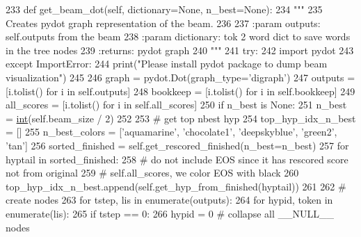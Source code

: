 \begin{DoxyCode}
233     \textcolor{keyword}{def }get\_beam\_dot(self, dictionary=None, n\_best=None):
234         \textcolor{stringliteral}{"""}
235 \textcolor{stringliteral}{        Creates pydot graph representation of the beam.}
236 \textcolor{stringliteral}{}
237 \textcolor{stringliteral}{        :param outputs: self.outputs from the beam}
238 \textcolor{stringliteral}{        :param dictionary: tok 2 word dict to save words in the tree nodes}
239 \textcolor{stringliteral}{        :returns: pydot graph}
240 \textcolor{stringliteral}{        """}
241         \textcolor{keywordflow}{try}:
242             \textcolor{keyword}{import} pydot
243         \textcolor{keywordflow}{except} ImportError:
244             print(\textcolor{stringliteral}{"Please install pydot package to dump beam visualization"})
245 
246         graph = pydot.Dot(graph\_type=\textcolor{stringliteral}{'digraph'})
247         outputs = [i.tolist() \textcolor{keywordflow}{for} i \textcolor{keywordflow}{in} self.outputs]
248         bookkeep = [i.tolist() \textcolor{keywordflow}{for} i \textcolor{keywordflow}{in} self.bookkeep]
249         all\_scores = [i.tolist() \textcolor{keywordflow}{for} i \textcolor{keywordflow}{in} self.all\_scores]
250         \textcolor{keywordflow}{if} n\_best \textcolor{keywordflow}{is} \textcolor{keywordtype}{None}:
251             n\_best = \hyperlink{namespacelanguage__model_1_1eval__ppl_a7d12ee00479673c5c8d1f6d01faa272a}{int}(self.beam\_size / 2)
252 
253         \textcolor{comment}{# get top nbest hyp}
254         top\_hyp\_idx\_n\_best = []
255         n\_best\_colors = [\textcolor{stringliteral}{'aquamarine'}, \textcolor{stringliteral}{'chocolate1'}, \textcolor{stringliteral}{'deepskyblue'}, \textcolor{stringliteral}{'green2'}, \textcolor{stringliteral}{'tan'}]
256         sorted\_finished = self.get\_rescored\_finished(n\_best=n\_best)
257         \textcolor{keywordflow}{for} hyptail \textcolor{keywordflow}{in} sorted\_finished:
258             \textcolor{comment}{# do not include EOS since it has rescored score not from original}
259             \textcolor{comment}{# self.all\_scores, we color EOS with black}
260             top\_hyp\_idx\_n\_best.append(self.get\_hyp\_from\_finished(hyptail))
261 
262         \textcolor{comment}{# create nodes}
263         \textcolor{keywordflow}{for} tstep, lis \textcolor{keywordflow}{in} enumerate(outputs):
264             \textcolor{keywordflow}{for} hypid, token \textcolor{keywordflow}{in} enumerate(lis):
265                 \textcolor{keywordflow}{if} tstep == 0:
266                     hypid = 0  \textcolor{comment}{# collapse all \_\_NULL\_\_ nodes}

\end{DoxyCode}
